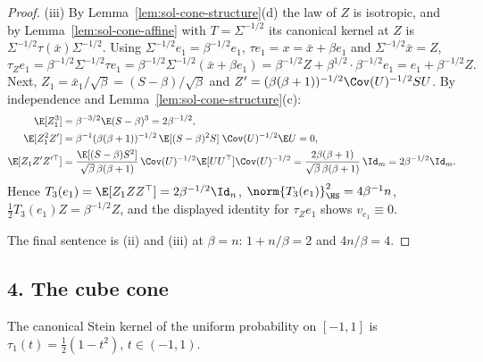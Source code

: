 \documentclass[../main.tex]{subfiles}
\begin{document}
\begin{proof}
(iii) By Lemma~\ref{lem:sol-cone-structure}(d) the law of $Z$ is isotropic, and by
Lemma~\ref{lem:sol-cone-affine} with $T=\Sigma^{-1/2}$ its canonical kernel at $Z$ is
$\Sigma^{-1/2}\tau(\bar x)\Sigma^{-1/2}$.  Using $\Sigma^{-1/2}e_1=\beta^{-1/2}e_1$,
$\tau e_1=x=\bar x+\beta e_1$ and $\Sigma^{-1/2}\bar x=Z$,
\[
  \tau_Ze_1=\beta^{-1/2}\Sigma^{-1/2}\tau e_1
  =\beta^{-1/2}\Sigma^{-1/2}(\bar x+\beta e_1)
  =\beta^{-1/2}Z+\beta^{1/2}\cdot\beta^{-1/2}e_1=e_1+\beta^{-1/2}Z .
\]
Next, $Z_1=\bar x_1/\sqrt\beta=(S-\beta)/\sqrt\beta$ and
$Z'=(\beta(\beta+1))^{-1/2}\Cov(U)^{-1/2}SU$.  By independence and
Lemma~\ref{lem:sol-cone-structure}(c):
\begin{align*}
  \E[Z_1^3]&=\beta^{-3/2}\E(S-\beta)^3=2\beta^{-1/2},\\
  \E[Z_1^2Z']&=\beta^{-1}(\beta(\beta+1))^{-1/2}\,\E[(S-\beta)^2S]\;\Cov(U)^{-1/2}\E U=0,\\
  \E[Z_1Z'Z'^\top]&=\frac{\E[(S-\beta)S^2]}{\sqrt\beta\,\beta(\beta+1)}\,\Cov(U)^{-1/2}\E[UU^\top]\Cov(U)^{-1/2}
  =\frac{2\beta(\beta+1)}{\sqrt\beta\,\beta(\beta+1)}\,\Id_m=2\beta^{-1/2}\Id_m .
\end{align*}
Hence $T_3(e_1)=\E[Z_1ZZ^\top]=2\beta^{-1/2}\Id_n$, $\norm{T_3(e_1)}_{\HS}^2=4\beta^{-1}n$,
$\tfrac12T_3(e_1)Z=\beta^{-1/2}Z$, and the displayed identity for $\tau_Ze_1$ shows
$v_{e_1}\equiv0$.

The final sentence is (ii) and (iii) at $\beta=n$: $1+n/\beta=2$ and $4n/\beta=4$.
\end{proof}

\subsection*{4. The cube cone}
\label{subsec:sol-cone-cube}

\begin{lemma}
\label{lem:sol-cone-1d}
The canonical Stein kernel of the uniform probability on $[-1,1]$ is
$\tau_1(t)=\tfrac12(1-t^2)$, $t\in(-1,1)$.
\end{lemma}
\end{document}
